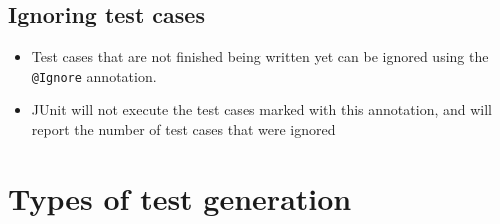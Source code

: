 \documentclass[12pt]{book}
\begin{document}
\subsection{Ignoring test cases}
\begin{itemize}
    \item Test cases that are not finished being written yet can be ignored using the \texttt{@Ignore} annotation.
    \item JUnit will not execute the test cases marked with this annotation, and will report the number of test cases that were ignored
\end{itemize}

\section{Types of test generation}
\end{document}
